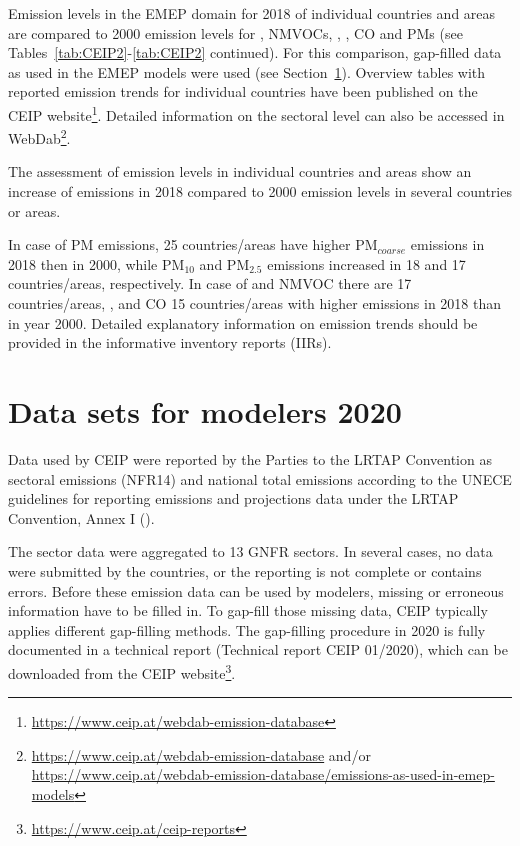 Emission levels in the EMEP domain for 2018 of individual countries and areas are compared to 2000 emission levels for \nox, NMVOCs, \sox, \nhiii, CO and PMs (see Tables~\ref{tab:CEIP2}-\ref{tab:CEIP2} continued). For this comparison, gap-filled data as used in the EMEP models were used (see Section~\ref{sec:modeldata}). Overview tables with reported emission trends for individual countries have been published on the CEIP website\footnote{\url{https://www.ceip.at/webdab-emission-database}}. Detailed information on the sectoral level can also be accessed in WebDab\footnote{\url{https://www.ceip.at/webdab-emission-database} and/or \url{https://www.ceip.at/webdab-emission-database/emissions-as-used-in-emep-models}}.

The assessment of emission levels in individual countries and areas show an increase of emissions in 2018 compared to 2000 emission levels in several countries or areas.

In case of PM emissions, 25 countries/areas have higher PM$_{coarse}$ emissions in 2018 then in 2000, while PM$_{10}$ and PM$_{2.5}$ emissions increased in 18 and 17 countries/areas, respectively. In case of \nox and NMVOC there are 17  countries/areas, ,  and CO 15
countries/areas with higher emissions in 2018 than in year 2000. Detailed explanatory information on emission trends should be provided in the informative inventory reports (IIRs). 


\section{Data sets for modelers 2020}
\label{sec:modeldata}

Data used by CEIP were reported by the Parties to the LRTAP Convention as sectoral emissions (NFR14) and national total emissions according to the UNECE guidelines for reporting emissions and projections data under the LRTAP Convention, Annex I (\cite{UNECE2014}).

The sector data were aggregated to 13 GNFR sectors. In several cases, no data were submitted by the countries, or the reporting is not complete or contains errors. Before these emission data can be used by modelers, missing or erroneous information have to be filled in. To gap-fill those missing data, CEIP typically applies different gap-filling methods. The gap-filling procedure in 2020 is fully documented in a technical report (Technical report CEIP 01/2020), which can be downloaded from the CEIP website\footnote{\url{https://www.ceip.at/ceip-reports}}.\\

